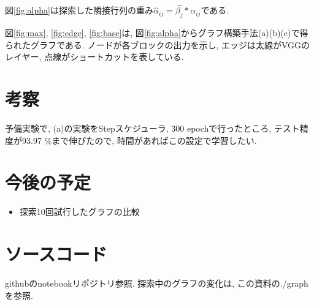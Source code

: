 \documentclass[twocolumn]{jarticle}     %
\begin{document}
図\ref{fig:alpha}は探索した隣接行列の重み$\hat{\alpha}_{ij} = \hat{\beta_j} * \alpha_{ij}$である.

図\ref{fig:max}, \ref{fig:edge}, \ref{fig:base}は, 図\ref{fig:alpha}からグラフ構築手法(a)(b)(c)で得られたグラフである.
ノードが各ブロックの出力を示し, エッジは太線がVGGのレイヤー, 点線がショートカットを表している.

\section{考察}
予備実験で, (a)の実験をStepスケジューラ, 300 epochで行ったところ, テスト精度が93.97 \%まで伸びたので,
時間があればこの設定で学習したい.

\section{今後の予定}
\begin{itemize}
  \item 探索10回試行したグラフの比較
\end{itemize}

\section{ソースコード}
githubのnotebookリポジトリ参照.
探索中のグラフの変化は, この資料の./graphを参照.



\end{document}
